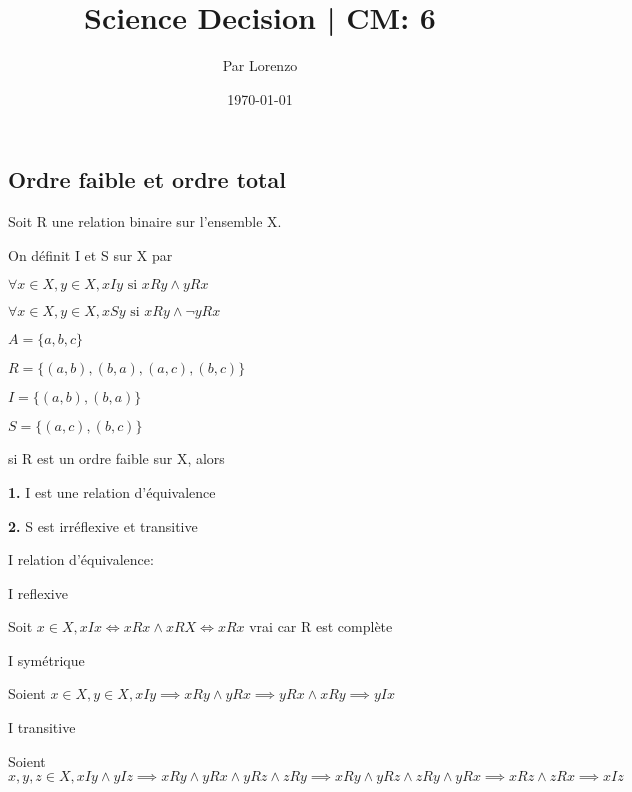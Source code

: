 \documentclass[a4paper, 12pt]{article}
\title{Science Decision | CM: 6}
\author{Par Lorenzo}
\date{\today}
\begin{document}
\maketitle

\subsection{Ordre faible et ordre total}

Soit R une relation binaire sur l'ensemble X.

\vspace{1em}

\noindent
On définit I et S sur X par

$\forall x \in X, y \in X, xIy \text{ si } xRy \land yRx$

$\forall x \in X, y \in X, xSy \text{ si } xRy \land \neg yRx$

\begin{example}
    $A = \{a, b, c\}$

    $R = \{(a, b), (b, a), (a, c), (b, c)\}$

    $I = \{(a, b), (b, a)\}$

    $S = \{(a, c), (b, c)\}$
\end{example}

\begin{proposition}
    si R est un ordre faible sur X, alors

    \item \textbf{1.} I est une relation d'équivalence
    \item \textbf{2.} S est irréflexive et transitive
\end{proposition}

\begin{demonstration}
    I relation d'équivalence:

    \item I reflexive
    
    Soit $x \in X, xIx \iff xRx \land xRX \iff xRx$ vrai car R est complète

    \item I symétrique
    
    Soient $x \in X, y \in X, xIy \implies xRy \land yRx \implies yRx \land xRy \implies yIx$

    \item I transitive
    
    Soient $x, y, z \in X, xIy \land yIz \implies xRy \land yRx \land yRz \land zRy \implies xRy \land yRz \land zRy \land yRx \implies xRz \land zRx \implies xIz$
\end{demonstration}
\end{document}

